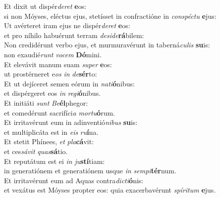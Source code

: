 \oddverse Et dixit ut dispér\textit{de}\textit{ret} \textbf{e}os:~\*\\
\oddverse si non Móyses, eléctus ejus, stetísset in confractióne in \textit{con}\textit{spé}\textit{ctu} \textbf{e}jus:\\
\evenverse Ut avérteret iram ejus ne dispér\textit{de}\textit{ret} \textbf{e}os:~\*\\
\evenverse et pro níhilo habuérunt terram \textit{de}\textit{si}\textit{de}\textbf{rá}bilem:\\
\oddverse Non credidérunt verbo ejus, et murmuravérunt in taberná\textit{cu}\textit{lis} \textbf{su}is:~\*\\
\oddverse non exaudié\textit{runt} \textit{vo}\textit{cem} \textbf{Dó}mini.\\
\evenverse Et elevávit manum suam \textit{su}\textit{per} \textbf{e}os:~\*\\
\evenverse ut prostérneret e\textit{os} \textit{in} \textit{de}\textbf{sér}to:\\
\oddverse Et ut dejíceret semen eórum in \textit{na}\textit{ti}\textbf{ó}nibus:~\*\\
\oddverse et dispérgeret eos \textit{in} \textit{re}\textit{gi}\textbf{ó}nibus.\\
\evenverse Et initiáti \textit{sunt} \textit{Be}\textbf{él}phegor:~\*\\
\evenverse et comedérunt sacrifíci\textit{a} \textit{mor}\textit{tu}\textbf{ó}rum.\\
\oddverse Et irritavérunt eum in adinventió\textit{ni}\textit{bus} \textbf{su}is:~\*\\
\oddverse et multiplicáta est in \textit{e}\textit{is} \textit{ru}\textbf{í}na.\\
\evenverse Et stetit Phínees, \textit{et} \textit{pla}\textbf{cá}vit:~\*\\
\evenverse et ces\textit{sá}\textit{vit} \textit{quas}\textbf{sá}tio.\\
\oddverse Et reputátum est ei \textit{in} \textit{ju}\textbf{stí}tiam:~\*\\
\oddverse in generatiónem et generatiónem usque \textit{in} \textit{sem}\textit{pi}\textbf{tér}num.\\
\evenverse Et irritavérunt eum ad Aquas contra\textit{di}\textit{cti}\textbf{ó}nis:~\*\\
\evenverse et vexátus est Móyses propter eos: quia exacerbavérunt \textit{spí}\textit{ri}\textit{tum} \textbf{e}jus.\\
